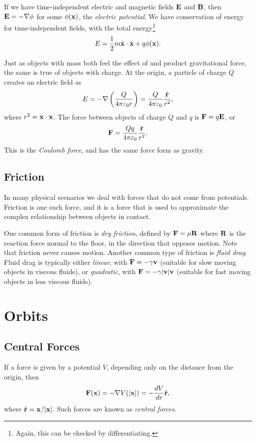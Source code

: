 \documentclass[a4paper]{scrartcl}
\newcommand{\hh}[1]{\hat{\vv{#1}}}
\begin{document}
If we have time-independent electric and magnetic fields $\mathbf{E}$ and $\mathbf{B}$, then $\mathbf{E} = - \nabla \phi$ for some $\phi(\mathbf{x})$, the \emph{electric potential}. We have conservation of energy for time-independent fields, with the total energy\footnote{Again, this can be checked by differentiating.}
$$
E = \frac{1}{2}m \dot{\mathbf{x}} \cdot \dot{\mathbf{x}} + q \phi(\mathbf{x}). 
$$

Just as objects with mass both feel the effect of and product gravitational force, the same is true of objects with charge. At the origin, a particle of charge $Q$ creates an electric field as
$$
E = - \nabla \left(\frac{Q}{4 \pi \varepsilon_0 r}\right) = \frac{Q}{4 \pi \varepsilon_0} \frac{\hh r}{r^2},
$$
where $r^2 = \mathbf{x} \cdot \mathbf{x}$. The force between objects of charge $Q$ and $q$ is $\mathbf{F} = q \mathbf{E}$, or
$$
\vv F = \frac{Qq}{4 \pi \varepsilon_0} \frac{\hh r}{r^2}.
$$
This is the \emph{Coulomb force}, and has the same force form as gravity.

\subsection{Friction}

In many physical scenarios we deal with forces that do not come from potentials. Friction is one such force, and it is a force that is used to approximate the complex relationship between objects in contact.

One common form of friction is \emph{dry friction}, defined by $\mathbf{F} = \mu \mathbf{R}$ where $\mathbf{R}$ is the reaction force normal to the floor, in the direction that opposes motion. Note that friction never causes motion. Another common type of friction is \emph{fluid drag}. Fluid drag is typically either \emph{linear}, with $\mathbf{F} = - \gamma \mathbf{v}$ (suitable for slow moving objects in viscous fluids), or \emph{quadratic}, with $\mathbf{F} = - \gamma |\mathbf{v}| \mathbf{v}$ (suitable for fast moving objects in less viscous fluids).




\section{Orbits}


\subsection{Central Forces}

If a force is given by a potential $V$, depending only on the distance from the origin, then
$$
\vv F(\vv x) = - \nabla V(|\vv x|) = - \frac{dV}{dr} \hh r,
$$
where $\hh r = \vv x/|\vv x|$. Such forces are known as \emph{central forces}.
\end{document}
